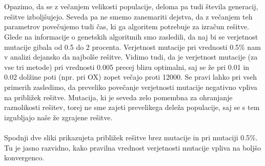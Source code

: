 \documentclass[12pt,a4paper]{amsart}
\theoremstyle{definition} %
\theoremstyle{plain} %
\begin{document}
\\
\\
Opazimo, da se z večanjem velikosti populacije, deloma pa tudi števila generacij, rešitve izboljšujejo. Seveda pa ne smemo zanemariti dejstva, da z večanjem teh parametrov povečujemo tudi čas, ki ga algoritem potrebuje za izračun rešitve.  Glede na informacije o genetskih algoritmih smo zasledili, da naj bi se verjetnost mutacije gibala od 0.5 do 2 procenta. Verjetnost mutacije pri vrednosti 0.5\% nam v analizi dejansko da najbolše rešitve. Vidimo tudi, da je verjetnost mutacije (za vse tri metode) pri vrednosti 0.005 precej blizu optimalni, saj se že pri 0.01 in 0.02 dolžine poti (npr. pri OX) zopet večajo proti 12000. Se pravi lahko pri vseh primerih zasledimo, da preveliko povečanje verjetnosti mutacije negativno vpliva na približek rešitve. Mutacija, ki je seveda zelo pomembna za ohranjanje raznolikosti rešitev, torej ne sme zajeti prevelikega deleža populacije, saj se s tem izgubljajo naše že zgrajene rešitve. 
\\
\\
Spodnji dve sliki prikazujeta približek rešitve brez mutacije in pri mutaciji 0.5\%. Tu je jasno razvidno, kako pravilna vrednost verjetnosti mutacije vpliva na boljšo konvergenco. 
\\
\\
\end{document}
